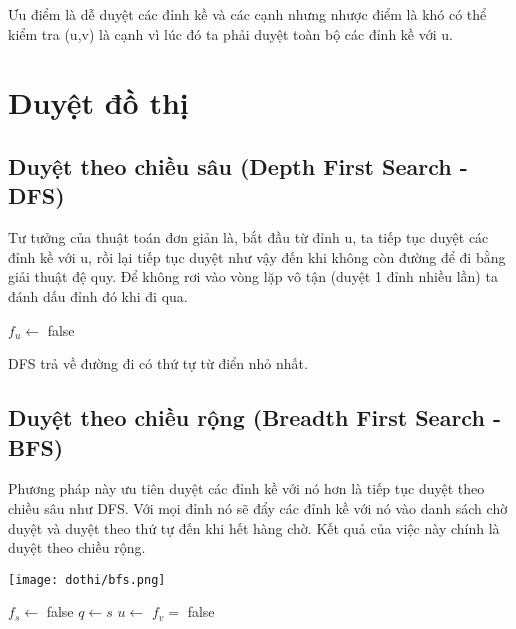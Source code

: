 Ưu điểm là dễ duyệt các đỉnh kề và các cạnh nhưng nhược điểm là khó có thể kiểm tra (u,v) là cạnh vì lúc đó ta phải duyệt toàn bộ các đỉnh kề với u.

\section{Duyệt đồ thị}
\subsection{Duyệt theo chiều sâu (Depth First Search - DFS)}
Tư tưởng của thuật toán đơn giản là, bắt đầu từ đỉnh u, ta tiếp tục duyệt các đỉnh kề với u, rồi lại tiếp tục duyệt như vậy đến khi không còn đường để đi bằng giải thuật đệ quy. Để không rơi vào vòng lặp vô tận (duyệt 1 đỉnh nhiều lần) ta đánh dấu đỉnh đó khi đi qua.

\begin{algorithmic}
        \State $f_u\gets$ false
                \State{}
            \EndIf
        \EndFor
    \EndFunction
\end{algorithmic}

DFS trả về đường đi có thứ tự từ điển nhỏ nhất.

\subsection{Duyệt theo chiều rộng (Breadth First Search - BFS)}
Phương pháp này ưu tiên duyệt các đỉnh kề với nó hơn là tiếp tục duyệt theo chiều sâu như DFS. Với mọi đỉnh nó sẽ đẩy các đỉnh kề với nó vào danh sách chờ duyệt và duyệt theo thứ tự đến khi hết hàng chờ. Kết quả của việc này chính là duyệt theo chiều rộng.

\texttt{[image: dothi/bfs.png]}

\begin{algorithmic}
        \State $f_s\gets$ false
        \State $q\gets{s}$
            \State $u\gets$
                    \State $f_v=$ false
                    \State{}
                \EndIf
            \EndFor
        \EndWhile
    \EndFunction
\end{algorithmic}

